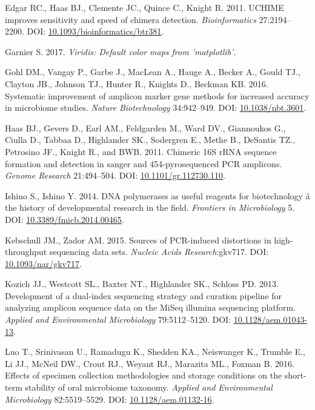 \documentclass[12pt,]{article}
\begin{document}
\hypertarget{ref-uchime_Edgar_2011}{}
Edgar RC., Haas BJ., Clemente JC., Quince C., Knight R. 2011. UCHIME
improves sensitivity and speed of chimera detection.
\emph{Bioinformatics} 27:2194--2200. DOI:
\href{https://doi.org/10.1093/bioinformatics/btr381}{10.1093/bioinformatics/btr381}.

\hypertarget{ref-viridis_citation_2017}{}
Garnier S. 2017. \emph{Viridis: Default color maps from 'matplotlib'}.

\hypertarget{ref-taq_Gohl_2016}{}
Gohl DM., Vangay P., Garbe J., MacLean A., Hauge A., Becker A., Gould
TJ., Clayton JB., Johnson TJ., Hunter R., Knights D., Beckman KB. 2016.
Systematic improvement of amplicon marker gene methods for increased
accuracy in microbiome studies. \emph{Nature Biotechnology} 34:942--949.
DOI: \href{https://doi.org/10.1038/nbt.3601}{10.1038/nbt.3601}.

\hypertarget{ref-Haas2011}{}
Haas BJ., Gevers D., Earl AM., Feldgarden M., Ward DV., Giannoukos G.,
Ciulla D., Tabbaa D., Highlander SK., Sodergren E., Methe B., DeSantis
TZ., Petrosino JF., Knight R., and BWB. 2011. Chimeric 16S rRNA sequence
formation and detection in sanger and 454-pyrosequenced PCR amplicons.
\emph{Genome Research} 21:494--504. DOI:
\href{https://doi.org/10.1101/gr.112730.110}{10.1101/gr.112730.110}.

\hypertarget{ref-polymerase_Ishino_2014}{}
Ishino S., Ishino Y. 2014. DNA polymerases as useful reagents for
biotechnology â the history of developmental research in the field.
\emph{Frontiers in Microbiology} 5. DOI:
\href{https://doi.org/10.3389/fmicb.2014.00465}{10.3389/fmicb.2014.00465}.

\hypertarget{ref-Kebschull2015}{}
Kebschull JM., Zador AM. 2015. Sources of PCR-induced distortions in
high-throughput sequencing data sets. \emph{Nucleic Acids
Research}:gkv717. DOI:
\href{https://doi.org/10.1093/nar/gkv717}{10.1093/nar/gkv717}.

\hypertarget{ref-protocol_Kozich_2013}{}
Kozich JJ., Westcott SL., Baxter NT., Highlander SK., Schloss PD. 2013.
Development of a dual-index sequencing strategy and curation pipeline
for analyzing amplicon sequence data on the MiSeq illumina sequencing
platform. \emph{Applied and Environmental Microbiology} 79:5112--5120.
DOI: \href{https://doi.org/10.1128/aem.01043-13}{10.1128/aem.01043-13}.

\hypertarget{ref-preservation_Luo_2016}{}
Luo T., Srinivasan U., Ramadugu K., Shedden KA., Neiswanger K., Trumble
E., Li JJ., McNeil DW., Crout RJ., Weyant RJ., Marazita ML., Foxman B.
2016. Effects of specimen collection methodologies and storage
conditions on the short-term stability of oral microbiome taxonomy.
\emph{Applied and Environmental Microbiology} 82:5519--5529. DOI:
\href{https://doi.org/10.1128/aem.01132-16}{10.1128/aem.01132-16}.
\end{document}
